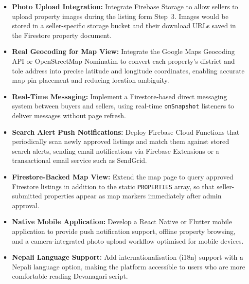 \documentclass[12pt,a4paper]{report}
\begin{document}
\begin{itemize}[leftmargin=2.5em]
  \item \textbf{Photo Upload Integration:}
    Integrate Firebase Storage to allow sellers to upload property images during
    the listing form Step~3. Images would be stored in a seller-specific storage
    bucket and their download URLs saved in the Firestore property document.

  \item \textbf{Real Geocoding for Map View:}
    Integrate the Google Maps Geocoding API or OpenStreetMap Nominatim to
    convert each property's district and tole address into precise latitude and
    longitude coordinates, enabling accurate map pin placement and reducing
    location ambiguity.

  \item \textbf{Real-Time Messaging:}
    Implement a Firestore-based direct messaging system between buyers and
    sellers, using real-time \texttt{onSnapshot} listeners to deliver messages
    without page refresh.

  \item \textbf{Search Alert Push Notifications:}
    Deploy Firebase Cloud Functions that periodically scan newly approved
    listings and match them against stored search alerts, sending email
    notifications via Firebase Extensions or a transactional email service such
    as SendGrid.

  \item \textbf{Firestore-Backed Map View:}
    Extend the map page to query approved Firestore listings in addition to the
    static \texttt{PROPERTIES} array, so that seller-submitted properties appear
    as map markers immediately after admin approval.

  \item \textbf{Native Mobile Application:}
    Develop a React Native or Flutter mobile application to provide push
    notification support, offline property browsing, and a camera-integrated
    photo upload workflow optimised for mobile devices.

  \item \textbf{Nepali Language Support:}
    Add internationalisation (i18n) support with a Nepali language option,
    making the platform accessible to users who are more comfortable reading
    Devanagari script.
\end{itemize}

\renewcommand{\bibname}{References}
\end{document}

